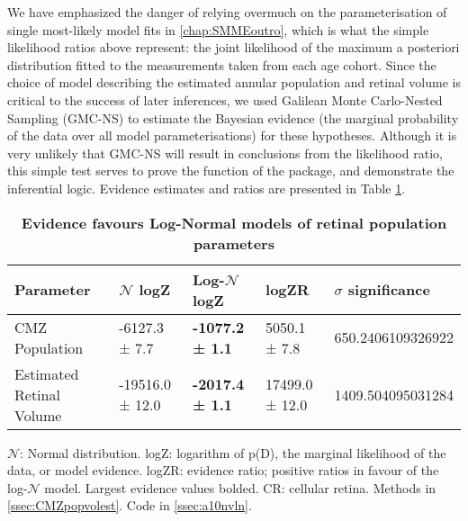 We have emphasized the danger of relying overmuch on the parameterisation of single most-likely model fits in \autoref{chap:SMMEoutro}, which is what the simple likelihood ratios above represent: the joint likelihood of the maximum a posteriori distribution fitted to the measurements taken from each age cohort. Since the choice of model describing the estimated annular population and retinal volume is critical to the success of later inferences, we used Galilean Monte Carlo-Nested Sampling (GMC-NS) to estimate the Bayesian evidence (the marginal probability of the data over all model parameterisations) for these hypotheses. Although it is very unlikely that GMC-NS will result in conclusions from the likelihood ratio, this simple test serves to prove the function of the  package, and demonstrate the inferential logic. Evidence estimates and ratios are presented in Table \ref{PZRtable}.

\begin{table}[!ht]
    \centering
    \caption{
    {\bf Evidence favours Log-Normal models of retinal population parameters}}
    \begin{tabular}{|l|l|l|l|l|}
    \hline
    {\bf Parameter} & {\bf $\mathcal{N}$ logZ} & {\bf Log-$\mathcal{N}$ logZ} & {\bf logZR} & {\bf $\sigma$ significance}\\ \hline
    CMZ Population & -6127.3 ± 7.7 & {\bf -1077.2 ± 1.1} & 5050.1 ± 7.8 & 650.2406109326922\\ \hline
    Estimated Retinal Volume & -19516.0 ± 12.0 & {\bf -2017.4 ± 1.1} & 17499.0 ± 12.0 & 1409.504095031284\\ \hline
    \end{tabular}
    \begin{flushleft} $\mathcal{N}$: Normal distribution. logZ: logarithm of p(D), the marginal likelihood of the data, or model evidence. logZR: evidence ratio; positive ratios in favour of the log-$\mathcal{N}$ model. Largest evidence values bolded. CR: cellular retina.
        Methods in \autoref{ssec:CMZpopvolest}.
        Code in \autoref{ssec:a10nvln}.
    \end{flushleft}
    \label{PZRtable}
\end{table}

